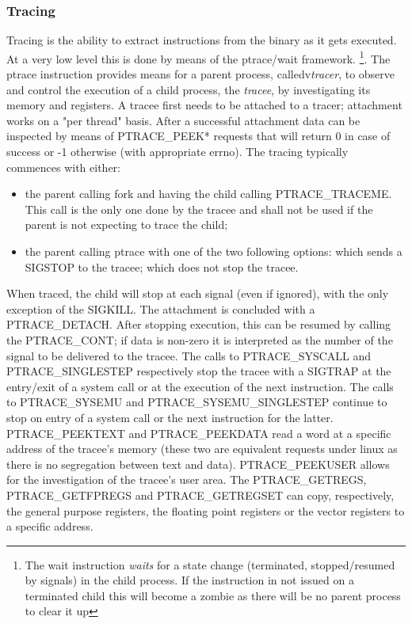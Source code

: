 \subsubsection{Tracing}
Tracing is the ability to extract instructions from the binary as it gets executed. At a very low level this is done by
means of the {\ttfamily ptrace/wait} framework. \footnote{The {\ttfamily wait} instruction \textit{waits} for a state
change (terminated, stopped/resumed by signals) in the child process. If the instruction in not issued on a terminated
child this will become a zombie as there will be no parent process to clear it up}. The {\ttfamily ptrace} instruction
provides means for a parent process, calledv\textit{tracer}, to observe and control the execution of a child process,
the \textit{tracee}, by investigating its memory and registers. A tracee first needs to be attached to a tracer;
attachment works on a "per thread" basis. After a successful attachment data can be inspected by means of {\ttfamily
PTRACE\_PEEK*} requests that will return 0 in case of success or -1 otherwise (with appropriate {\ttfamily errno}). The
tracing typically commences with either:
\begin{itemize}
    \item the parent calling {\ttfamily fork} and having the child calling {\ttfamily PTRACE\_TRACEME}. This call is the
        only one done by the tracee and shall not be used if the parent is not expecting to trace the child;
    \item the parent calling {\ttfamily ptrace} with one of the two following options:
         which sends a {\ttfamily SIGSTOP} to the tracee;
         which does not stop the tracee.
\end{itemize}
When traced, the child will stop at each signal (even if ignored), with the only exception of the {\ttfamily SIGKILL}.
The attachment is concluded with a {\ttfamily PTRACE\_DETACH}. After stopping execution, this can be resumed by calling
the {\ttfamily PTRACE\_CONT}; if data is non-zero it is interpreted as the number of the signal to be delivered to the
tracee. The calls to {\ttfamily PTRACE\_SYSCALL} and {\ttfamily PTRACE\_SINGLESTEP} respectively stop the tracee with a
{\ttfamily SIGTRAP} at the entry/exit of a system call or at the execution of the next instruction. The calls to
{\ttfamily PTRACE\_SYSEMU} and {\ttfamily PTRACE\_SYSEMU\_SINGLESTEP} continue to stop on entry of a system call or the
next instruction for the latter. {\ttfamily PTRACE\_PEEKTEXT} and {\ttfamily PTRACE\_PEEKDATA} read a word at a specific
address of the tracee's memory (these two are equivalent requests under linux as there is no segregation between text
and data). {\ttfamily PTRACE\_PEEKUSER} allows for the investigation of the tracee's user area. The {\ttfamily
PTRACE\_GETREGS}, {\ttfamily PTRACE\_GETFPREGS} and {\ttfamily PTRACE\_GETREGSET} can copy, respectively, the general
purpose registers, the floating point registers or the vector registers to a specific address.

